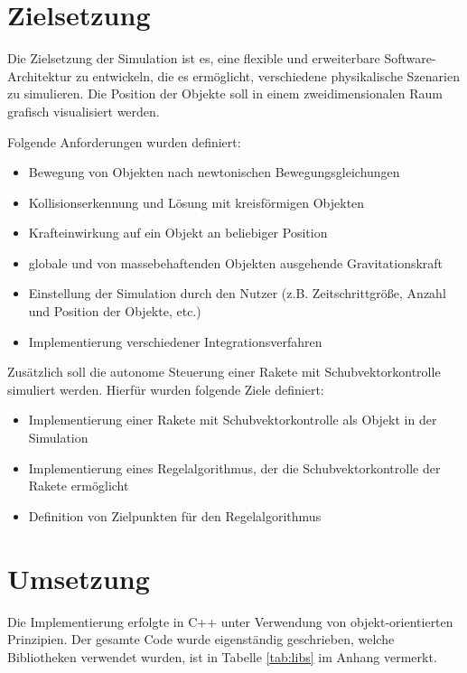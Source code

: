 \documentclass[10pt,twocolumn]{extarticle}
\begin{document}
\section{Zielsetzung}

Die Zielsetzung der Simulation ist es, eine flexible und erweiterbare Software-Architektur zu entwickeln, die es ermöglicht, verschiedene physikalische Szenarien zu simulieren. Die Position der Objekte soll in einem zweidimensionalen Raum grafisch visualisiert werden.

Folgende Anforderungen wurden definiert:

\begin{itemize}
\item Bewegung von Objekten nach newtonischen Bewegungsgleichungen
\item Kollisionserkennung und Lösung mit kreisförmigen Objekten
\item Krafteinwirkung auf ein Objekt an beliebiger Position
\item globale und von massebehaftenden Objekten ausgehende Gravitationskraft
\item Einstellung der Simulation durch den Nutzer (z.B. Zeitschrittgröße, Anzahl und Position der Objekte, etc.)
\item Implementierung verschiedener Integrationsverfahren
\end{itemize}

Zusätzlich soll die autonome Steuerung einer Rakete mit Schubvektorkontrolle simuliert werden. Hierfür wurden folgende Ziele definiert:

\begin{itemize}
\item Implementierung einer Rakete mit Schubvektorkontrolle als Objekt in der Simulation
\item Implementierung eines Regelalgorithmus, der die Schubvektorkontrolle der Rakete ermöglicht
\item Definition von Zielpunkten für den Regelalgorithmus
\end{itemize}


\section{Umsetzung}

Die Implementierung erfolgte in C++ unter Verwendung von objekt-orientierten Prinzipien. Der gesamte Code wurde eigenständig geschrieben, welche Bibliotheken verwendet wurden, ist in Tabelle \ref{tab:libs} im Anhang vermerkt.
\end{document}
